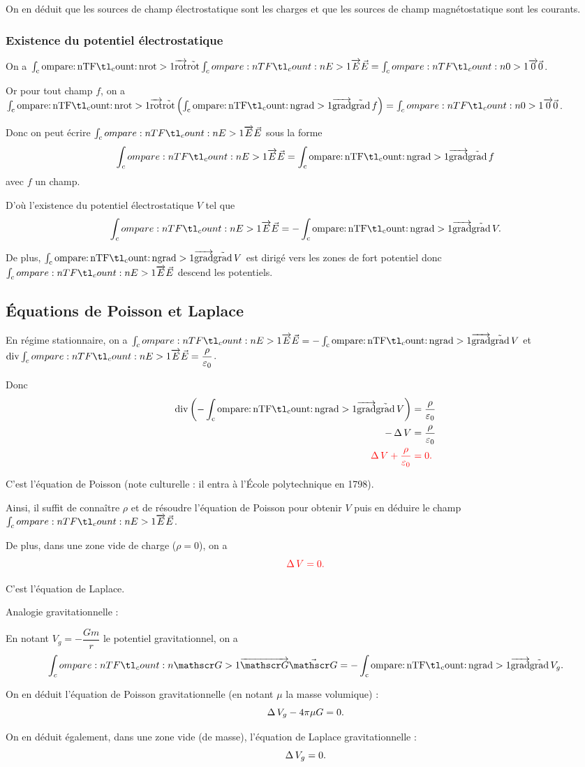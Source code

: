 On en déduit que les sources de champ électrostatique sont les charges et que les sources de champ magnétostatique sont les courants.

\subsubsection{Existence du potentiel électrostatique}

On a \(\rot\v{E}=\v{0}\).

Or pour tout champ \(f\), on a \(\rot\paren{\grad f}=\v{0}\).

Donc on peut écrire \(\v{E}\) sous la forme \[\v{E}=\grad f\] avec \(f\) un champ.

D'où l'existence du potentiel électrostatique \(V\) tel que \[\v{E}=-\grad V.\]

De plus, \(\grad V\) est dirigé vers les zones de fort potentiel donc \(\v{E}\) descend les potentiels.

\subsection{Équations de Poisson et Laplace}

En régime stationnaire, on a \(\v{E}=-\grad V\) et \(\div\v{E}=\dfrac{\rho}{\epsilon_0}\).

Donc \[\begin{aligned}
\div\paren{-\grad V}&=\dfrac{\rho}{\epsilon_0} \\
-\lap V&=\dfrac{\rho}{\epsilon_0} \\
\color{red}\lap V+\dfrac{\rho}{\epsilon_0}&\color{red}=0.\color{black}
\end{aligned}\]

C'est l'équation de Poisson (note culturelle : il entra à l'École polytechnique en 1798).

Ainsi, il suffit de connaître \(\rho\) et de résoudre l'équation de Poisson pour obtenir \(V\) puis en déduire le champ \(\v{E}\).

De plus, dans une zone vide de charge (\(\rho=0\)), on a \[\color{red}\operatorname{\Delta} V=0.\color{black}\]

C'est l'équation de Laplace.

Analogie gravitationnelle :

En notant \(V_g=-\dfrac{Gm}{r}\) le potentiel gravitationnel, on a \[\v{\call{G}}=-\grad V_g.\]

On en déduit l'équation de Poisson gravitationnelle (en notant \(\mu\) la masse volumique) : \[\operatorname{\Delta} V_g-4\pi\mu G=0.\]

On en déduit également, dans une zone vide (de masse), l'équation de Laplace gravitationnelle : \[\operatorname{\Delta} V_g=0.\]
